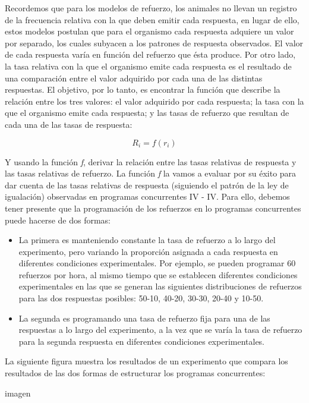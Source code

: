 \documentclass[
  letterpaper,
]{book}
\providecommand{\tightlist}{%
  \setlength{\itemsep}{0pt}\setlength{\parskip}{0pt}}\usepackage{longtable,booktabs,array}
\begin{document}
Recordemos que para los modelos de refuerzo, los animales no llevan un
registro de la frecuencia relativa con la que deben emitir cada
respuesta, en lugar de ello, estos modelos postulan que para el
organismo cada respuesta adquiere un valor por separado, los cuales
subyacen a los patrones de respuesta observados. El valor de cada
respuesta varía en función del refuerzo que ésta produce. Por otro lado,
la tasa relativa con la que el organismo emite cada respuesta es el
resultado de una comparación entre el valor adquirido por cada una de
las distintas respuestas. El objetivo, por lo tanto, es encontrar la
función que describe la relación entre los tres valores: el valor
adquirido por cada respuesta; la tasa con la que el organismo emite cada
respuesta; y las tasas de refuerzo que resultan de cada una de las tasas
de respuesta:

\[R_i = f (r_i)\]

Y usando la función \emph{f}, derivar la relación entre las tasas
relativas de respuesta y las tasas relativas de refuerzo. La función
\emph{f} la vamos a evaluar por su éxito para dar cuenta de las tasas
relativas de respuesta (siguiendo el patrón de la ley de igualación)
observadas en programas concurrentes IV - IV. Para ello, debemos tener
presente que la programación de los refuerzos en lo programas
concurrentes puede hacerse de dos formas:

\begin{itemize}
\tightlist
\item
  La primera es manteniendo constante la tasa de refuerzo a lo largo del
  experimento, pero variando la proporción asignada a cada respuesta en
  diferentes condiciones experimentales. Por ejemplo, se pueden
  programar 60 refuerzos por hora, al mismo tiempo que se establecen
  diferentes condiciones experimentales en las que se generan las
  siguientes distribuciones de refuerzos para las dos respuestas
  posibles: 50-10, 40-20, 30-30, 20-40 y 10-50.
\item
  La segunda es programando una tasa de refuerzo fija para una de las
  respuestas a lo largo del experimento, a la vez que se varía la tasa
  de refuerzo para la segunda respuesta en diferentes condiciones
  experimentales.
\end{itemize}

La siguiente figura muestra los resultados de un experimento que compara
los resultados de las dos formas de estructurar los programas
concurrentes:

imagen
\end{document}
